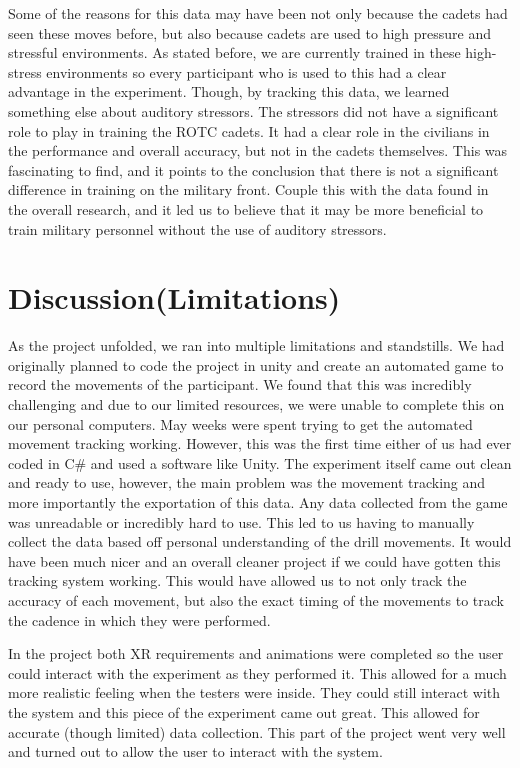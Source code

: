 \documentclass[manuscript,screen,review]{acmart}
\begin{document}
Some of the reasons for this data may have been not only because the cadets had seen these moves before, but 
also because cadets are used to high pressure and stressful environments. As stated before, we are currently 
trained in these high-stress environments so every participant who is used to this had a clear advantage in the 
experiment. Though, by tracking this data, we learned something else about auditory stressors. The stressors 
did not have a significant role to play in training the ROTC cadets. It had a clear role in the civilians in 
the performance and overall accuracy, but not in the cadets themselves. This was fascinating to find, and it 
points to the conclusion that there is not a significant difference in training on the military front. Couple 
this with the data found in the overall research, and it led us to believe that it may be more beneficial to 
train military personnel without the use of auditory stressors.

\section{Discussion(Limitations)}
As the project unfolded, we ran into multiple limitations and standstills. We had originally planned to code 
the project in unity and create an automated game to record the movements of the participant. We found that 
this was incredibly challenging and due to our limited resources, we were unable to complete this on our 
personal computers. May weeks were spent trying to get the automated movement tracking working. However, 
this was the first time either of us had ever coded in C\# and used a software like Unity. 
The experiment itself came out clean and ready to use, however, the main problem was the movement tracking and more 
importantly the exportation of this data. Any data collected from the game was unreadable or incredibly 
hard to use. This led to us having to manually collect the data based off personal understanding of the 
drill movements. It would have been much nicer and an overall cleaner project if we could have gotten 
this tracking system working. This would have allowed us to not only track the accuracy of each movement, 
but also the exact timing of the movements to track the cadence in which they were performed.  

In the project both XR requirements and animations were completed so the user could interact with the 
experiment as they performed it. This allowed for a much more realistic feeling when the testers were 
inside. They could still interact with the system and this piece of the experiment came out great. This 
allowed for accurate (though limited) data collection. This part of the project went very well and turned 
out to allow the user to interact with the system. 
\end{document}
